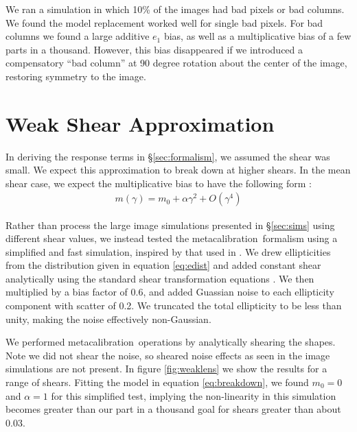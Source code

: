 \documentclass[iop]{emulateapj}
\newcommand{\mcal}{metacalibration}
\begin{document}
We ran a simulation in which 10\% of the images had bad pixels or bad columns.
We found the model replacement worked well for single bad pixels. For bad
columns we found a large additive $e_1$ bias, as well as a multiplicative bias
of a few parts in a thousand.  However, this bias disappeared if we introduced
a compensatory ``bad column'' at 90 degree rotation about the center of the
image, restoring symmetry to the image. 

\section{Weak Shear Approximation}

In deriving the response terms in \S \ref{sec:formalism}, we assumed the shear
was small. We expect this approximation to break down at higher shears.
In the mean shear case, we expect the multiplicative bias to have the
following form \citep{bfd2016}:
\begin{align} \label{eq:breakdown}
	m(\gamma) = m_0 + \alpha \gamma^2 + O(\gamma^4)
\end{align}

Rather than process the large image simulations presented in \S \ref{sec:sims} using
different shear values, we instead tested the \mcal\ formalism using a
simplified and fast simulation, inspired by that used in \citep{ba14}.  We drew
ellipticities from the distribution given in equation \ref{eq:edist} and added
constant shear analytically using the standard shear transformation equations
\citep{SeitzSchneider97}.  We then multiplied by a bias factor of 0.6, and
added Guassian noise to each ellipticity component with scatter of 0.2. We
truncated the total ellipticity to be less than unity, making the noise
effectively non-Gaussian.

We performed \mcal\ operations by analytically shearing the shapes.  Note we
did not shear the noise, so sheared noise effects as seen in the image
simulations are not present.  In figure \ref{fig:weaklens} we show the results
for a range of shears.  Fitting the model in equation \ref{eq:breakdown}, we
found $m_0=0$ and $\alpha=1$ for this simplified test, implying  the
non-linearity in this simulation becomes greater than our part in a thousand
goal for shears greater than about 0.03.
\end{document}
